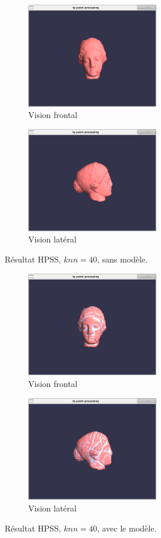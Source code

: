 \documentclass[a4,12pt]{report}
\begin{document}
\begin{figure}[!h]
	\centering
	\begin{subfigure}[b]{0.5\textwidth}
		\centering
		\includegraphics[height=1.8in]{figs/caso5-knn20-frontal-sem.png}
		\caption{Vision frontal}
	\end{subfigure}%
	\begin{subfigure}[b]{0.5\textwidth}
		\centering
		\includegraphics[height=1.8in]{figs/caso5-knn20-lateral-sem.png}
		\caption{Vision latéral}
	\end{subfigure}
	\caption{Résultat HPSS, $knn=40$, sans modèle.}
	\label{fig:9}
\end{figure}

\begin{figure}[!h]
	\centering
	\begin{subfigure}[b]{0.5\textwidth}
		\centering
		\includegraphics[height=1.8in]{figs/caso5-knn20-frontal-com.png}
		\caption{Vision frontal}
	\end{subfigure}%
	\begin{subfigure}[b]{0.5\textwidth}
		\centering
		\includegraphics[height=1.8in]{figs/caso5-knn20-lateral-com.png}
		\caption{Vision latéral}
	\end{subfigure}
	\label{fig:10}
	\caption{Résultat HPSS, $knn=40$, avec le modèle.}
\end{figure}
\end{document}
